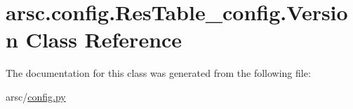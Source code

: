 \hypertarget{classarsc_1_1config_1_1ResTable__config_1_1Version}{}\section{arsc.\+config.\+Res\+Table\+\_\+config.\+Version Class Reference}
\label{classarsc_1_1config_1_1ResTable__config_1_1Version}


The documentation for this class was generated from the following file\+:\begin{DoxyCompactItemize}
\item 
arsc/\mbox{\hyperlink{config_8py}{config.\+py}}\end{DoxyCompactItemize}
